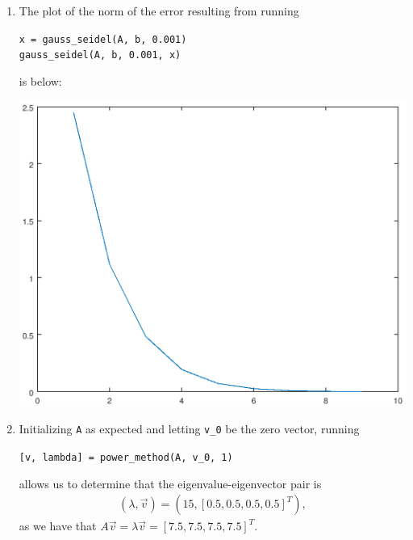 \documentclass[a4paper,12pt]{article}
\begin{document}
\begin{enumerate}
    \item
        The plot of the norm of the error resulting from running
        \begin{center}
            \texttt{x = gauss\_seidel(A, b, 0.001)} \\
            \texttt{gauss\_seidel(A, b, 0.001, x)} \\
        \end{center}
        is below:
        \begin{center}
            \includegraphics[scale=0.25]{gauss_seidel_error}
        \end{center}

    \item
        Initializing \texttt{A} as expected and letting \texttt{v\_0} be the zero vector, running
        \begin{center}
            \texttt{[v, lambda] = power\_method(A, v\_0, 1)}
        \end{center}
        allows us to determine that the eigenvalue-eigenvector pair is
        \begin{align*}
            (\lambda, \vec{v}) = (15, [0.5, 0.5, 0.5, 0.5]^T),
        \end{align*}
        as we have that $A\vec{v} = \lambda\vec{v} = [7.5, 7.5, 7.5, 7.5]^T$.
\end{enumerate}
\end{document}
